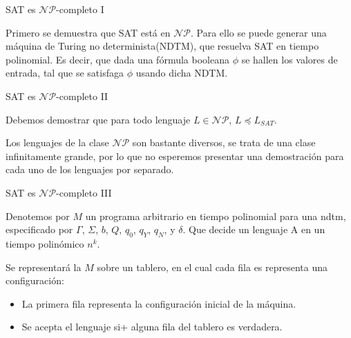 \documentclass[10pt, mathserif, profesionalfont]{beamer}
\begin{document}
\begin{frame}{SAT es $\mathcal{NP}$-completo I}

  \begin{block}{}
    Primero se demuestra que SAT está en $\mathcal{NP}$. Para ello se puede generar
    una máquina de Turing no determinista(NDTM), que resuelva SAT en tiempo polinomial.
    Es decir, que dada una fórmula booleana $\phi$ se hallen los valores de entrada, tal
    que se satisfaga $\phi$ usando dicha NDTM.
  \end{block}

\end{frame}

\begin{frame}{SAT es $\mathcal{NP}$-completo II}

\begin{block}{}
  Debemos demostrar que para todo lenguaje $L\in \mathcal{NP}$,
  $L \preceq L_{SAT}$.
\end{block}

\begin{block}{}
  Los lenguajes de la clase $\mathcal{NP}$
  son bastante diversos, se trata de una clase infinitamente grande, por lo que
  no esperemos presentar una demostración para cada uno de los lenguajes por
  separado.
\end{block}

\end{frame}


\begin{frame}{SAT es $\mathcal{NP}$-completo III}

\begin{block}{}
  Denotemos por $M$ un programa arbitrario en tiempo polinomial
  para una \gls{ndtm}, especificado por $\Gamma$, $\Sigma$, $b$, $Q$, $q_0$,
  $q_Y$, $q_N$, y $\delta$. Que decide un lenguaje A en un tiempo polinómico
  $n^k$.
\end{block}

\begin{block}{}
  Se representará la $M$ sobre un tablero, en el cual cada fila es representa una configuración:
  \begin{itemize}
  	\item La primera fila representa la configuración inicial de la máquina.
    \item Se acepta el lenguaje si+ alguna fila del tablero es verdadera.
  \end{itemize}
\end{block}

\end{frame}
\end{document}
